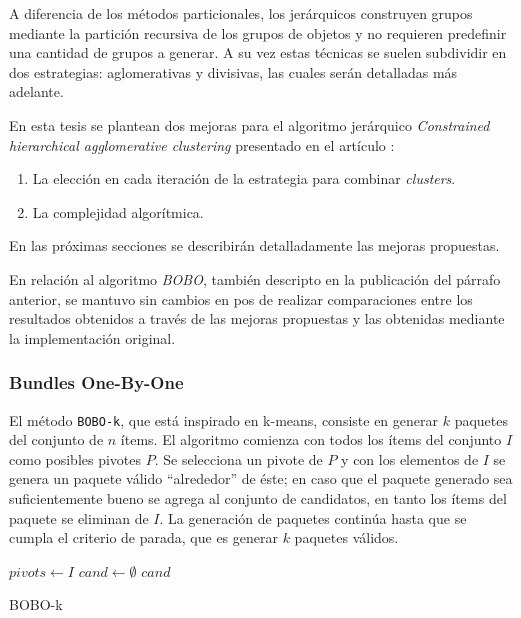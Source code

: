 A diferencia de los métodos particionales, los jerárquicos construyen grupos mediante la partición recursiva de los grupos de objetos y no requieren predefinir una cantidad de grupos a generar. A su vez estas técnicas se suelen subdividir en dos estrategias: aglomerativas y divisivas, las cuales serán detalladas más adelante.

En esta tesis se plantean dos mejoras para el algoritmo jerárquico \textit{Constrained hierarchical agglomerative clustering} presentado en el artículo \cite{journals/tkde/Amer-YahiaBCFMZ14}: 
\begin{enumerate}
	\item La elección en cada iteración de la estrategia para combinar \textit{clusters}.
	\item La complejidad algorítmica.
\end{enumerate}
En las próximas secciones se describirán detalladamente las mejoras propuestas.

En relación al algoritmo \textit{BOBO}, también descripto en la publicación del párrafo anterior, se mantuvo sin cambios en pos de realizar comparaciones entre los resultados obtenidos a través de las mejoras propuestas y las obtenidas mediante la implementación original.

\subsubsection{Bundles One-By-One}
El método \texttt{BOBO-k}, que está inspirado en k-means, consiste en generar $k$ paquetes del conjunto de $n$ ítems. El algoritmo comienza con todos los ítems del conjunto $I$ como posibles pivotes $P$. Se selecciona un pivote de $P$ y con los elementos de $I$ se genera un paquete válido ``alrededor'' de éste; en caso que el paquete generado sea suficientemente bueno se agrega al conjunto de candidatos, en tanto los ítems del paquete se eliminan de $I$. La generación de paquetes continúa hasta que se cumpla el criterio de parada, que es generar $k$ paquetes válidos.

\begin{center}
	\begin{algorithm}[H]
	\DontPrintSemicolon
	\SetAlgoLined
		$pivots \leftarrow I$\;
		$cand \leftarrow \emptyset$\;
		\Return $cand$\;
	\caption{BOBO-k}\label{alg:bobo}
	\end{algorithm}
\end{center}

